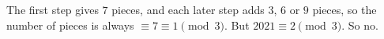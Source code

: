 The first step gives $7$ pieces, and each later step adds $3$, $6$ or $9$ pieces, so the number of pieces is always $\equiv7\equiv1\pmod3$. But $2021\equiv2\pmod3$. So $\boxed{\text{no}}$.

